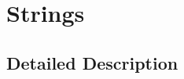 \hypertarget{group__strings}{}\section{Strings}
\label{group__strings}


\subsection{Detailed Description}
